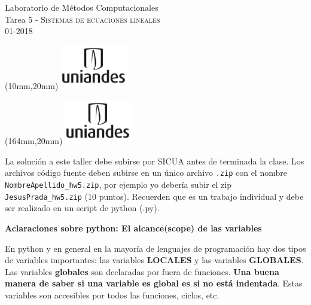 \documentclass[11pt,letterpaper]{exam}
\begin{document}
\begin{center}
{\Large Laboratorio de M\'etodos Computacionales} \\
Tarea 5 - \textsc{Sistemas de ecuaciones lineales}\\
01-2018\\
\end{center}

\begin{textblock*}{40mm}(10mm,20mm)
  \includegraphics[width=3cm]{logoUniandes}
\end{textblock*}

\begin{textblock*}{40mm}(164mm,20mm)
  \includegraphics[width=3cm]{logoUniandes}
\end{textblock*}

\vspace{0.3cm}

\noindent
La soluci\'on a este taller debe subirse por SICUA antes de terminada la clase.
\noindent
Los archivos c\'odigo fuente deben subirse en un \'unico archivo
\verb".zip" con el nombre \verb"NombreApellido_hw5.zip", por ejemplo
yo deber\'ia subir el zip \verb"JesusPrada_hw5.zip" (10 puntos). Recuerden que es un trabajo individual y debe ser realizado en un script de python (.py).

\vspace{0.3cm}

\LARGE \textbf{Aclaraciones sobre python: El alcance(scope) de las variables}\\

\normalsize

En python y en general en la mayor\'ia de lenguajes de programaci\'on hay dos tipos de variables importantes: las variables \textbf{LOCALES} y las variables \textbf{GLOBALES}.\\

Las variables \textbf{globales} son declaradas por fuera de funciones. \textbf{Una buena manera de saber si una variable es global es si no est\'a indentada}. Estas variables son accesibles por todos las funciones, ciclos, etc.\\
\end{document}
